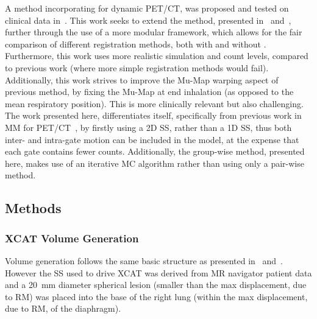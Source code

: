             A method incorporating  for dynamic \gls{PET}/\gls{CT}, was proposed and tested on clinical data in~\parencite{Chan2018Non-RigidPET}. This work seeks to extend the method, presented in~ and~, further through the use of a more modular framework, which allows for the fair comparison of different registration methods, both with and without . Furthermore, this work uses more realistic simulation and count levels, compared to previous work (where more simple registration methods would fail). Additionally, this work strives to improve the \gls{Mu-Map} warping aspect of previous method, by fixing the \gls{Mu-Map} at end inhalation (as opposed to the mean respiratory position). This is more clinically relevant but also challenging. The work presented here, differentiates itself, specifically from previous work in \gls{MM} for \gls{PET}/\gls{CT}~\parencite{Chan2018Non-RigidPET}, by firstly using a \gls{2D} \gls{SS}, rather than a \gls{1D} \gls{SS}, thus both inter- and intra-gate motion can be included in the model, at the expense that each gate contains fewer counts. Additionally, the group-wise method, presented here, makes use of an iterative \gls{MC} algorithm rather than using only a pair-wise method.
        
        \subsection{Methods} \label{sec:comparison_of_motion_correction_methods_incorporating_motion_modelling_for_pet/ct_using_a_single_breath_hold_attenuation_map_methods}
            \subsubsection{XCAT Volume Generation} \label{sec:comparison_of_motion_correction_methods_incorporating_motion_modelling_for_pet/ct_using_a_single_breath_hold_attenuation_map_xcat_volume_generation}
                Volume generation follows the same basic structure as presented in~ and~. However the \gls{SS} used to drive \gls{XCAT} was derived from \gls{MR} navigator patient data and a \SI{20}{\milli\metre} diameter spherical lesion (smaller than the max displacement, due to \gls{RM}) was placed into the base of the right lung (within the max displacement, due to \gls{RM}, of the diaphragm).
            
